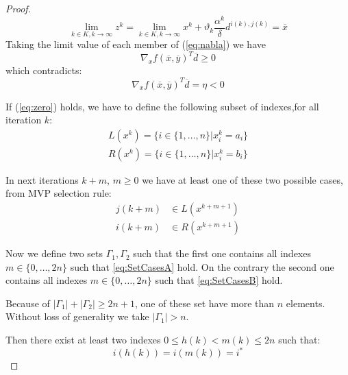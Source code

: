 \begin{proof}
\begin{equation}
\lim_{k \in K, k \rightarrow \infty} z^k = \lim_{k \in K, k \rightarrow \infty} x^k + \vartheta_k \frac{\alpha^k}{\delta} d^{i(k),j(k)} = \overline{x}
\end{equation}
Taking the limit value of each member of (\ref{eq:nabla}) we have
\begin{equation}
\nabla_x f(\overline{x},\overline{y})^T \overline{d} \geq 0 %
\end{equation}
which contradicts:
\begin{equation}
\nabla_x f(\overline{x},\overline{y})^T \overline{d} =\eta <0
\end{equation}


If (\ref{eq:zero}) holds, we have to define the following subset of indexes,for all iteration $k$:
\begin{equation}
 \begin{aligned}
   L(x^k) =\{ i \in\{1,\ldots,n \}| x^k_i = a_i\}\\
  R(x^k) =\{i \in\{1,\ldots,n \} | x^k_i = b_i\}
 \end{aligned}
\end{equation}

In next iterations $k+m$, $m\ge 0$ we have at least one of these two possible cases, from MVP selection rule:
\begin{subequations}
\begin{align}
 j(k+m) &\in L(x^{k+m+1})\label{eq:SetCasesA}\\
 i(k+m) &\in R(x^{k+m+1})\label{eq:SetCasesB}
\end{align}
\end{subequations}

Now we define two sets $\Gamma_1,\Gamma_2$ such that the first one contains all indexes $m \in\{0,\ldots,2n\}$ such that \ref{eq:SetCasesA} hold.
On the contrary the second one contains all indexes $m \in\{0,\ldots,2n\}$ such that \ref{eq:SetCasesB} hold.

Because of $|\Gamma_1|+|\Gamma_2|\ge2n+1$, one of these set have more than $n$ elements. Without loss of generality we take $|\Gamma_1|> n$.

Then there exist at least two indexes $0\le h(k)< m(k)\le 2n$ such that:
\begin{equation}
 i(h(k))=i(m(k))=i^*
\end{equation}


\end{proof}
